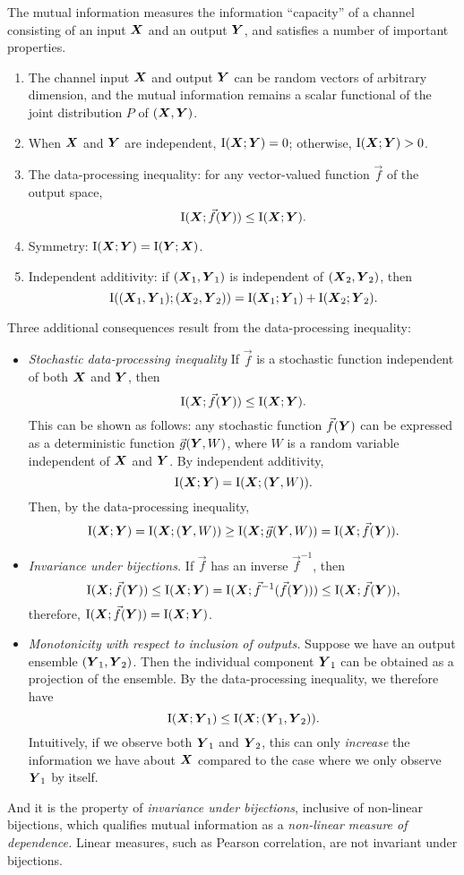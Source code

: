 \documentclass[12pt]{article}
\begin{document}
The mutual information measures the information ``capacity'' of a
channel consisting of an input $\boldsymbol{X}$ and an output $\boldsymbol{Y}$, and
satisfies a number of important properties.
\begin{enumerate}
\item The channel input $\boldsymbol{X}$ and output $\boldsymbol{Y}$ can be random vectors of arbitrary dimension, and the mutual information remains a scalar functional of the joint distribution $P$ of $(\boldsymbol{X}, \boldsymbol{Y})$.
\item When $\boldsymbol{X}$ and $\boldsymbol{Y}$ are independent, $\text{I}(\boldsymbol{X}; \boldsymbol{Y}) = 0$; otherwise, $\text{I}(\boldsymbol{X}; \boldsymbol{Y}) > 0$.
\item The data-processing inequality: for any vector-valued function $\vec{f}$ of the output space,
\[
\text{I}(\boldsymbol{X}; \vec{f}(\boldsymbol{Y})) \leq \text{I}(\boldsymbol{X}; \boldsymbol{Y}).
\]
\item Symmetry: $\text{I}(\boldsymbol{X}; \boldsymbol{Y}) = \text{I}(\boldsymbol{Y}; \boldsymbol{X})$.
\item Independent additivity: if $(\boldsymbol{X}_1,\boldsymbol{Y}_1)$ is independent of $(\boldsymbol{X}_2, \boldsymbol{Y}_2)$, then
\[
\text{I}((\boldsymbol{X}_1,\boldsymbol{Y}_1); (\boldsymbol{X}_2, \boldsymbol{Y}_2)) = \text{I}(\boldsymbol{X}_1; \boldsymbol{Y}_1) + \text{I}(\boldsymbol{X}_2; \boldsymbol{Y}_2).
\]
\end{enumerate}
Three additional consequences result from the data-processing inequality:
\begin{itemize}
\item \emph{Stochastic data-processing inequality}  If $\vec{f}$ is a stochastic function independent of both $\boldsymbol{X}$ and $\boldsymbol{Y}$, then
\[
\text{I}(\boldsymbol{X}; \vec{f}(\boldsymbol{Y})) \leq \text{I}(\boldsymbol{X}; \boldsymbol{Y}).
\]
This can be shown as follows: any stochastic function $\vec{f}(\boldsymbol{Y})$
can be expressed as a deterministic function $\vec{g}(\boldsymbol{Y}, W)$, where
$W$ is a random variable independent of $\boldsymbol{X}$ and $\boldsymbol{Y}$.
By independent additivity,
\[
\text{I}(\boldsymbol{X}; \boldsymbol{Y}) = \text{I}(\boldsymbol{X}; (\boldsymbol{Y}, W)).
\]
Then, by the data-processing inequality,
\[
\text{I}(\boldsymbol{X}; \boldsymbol{Y}) = \text{I}(\boldsymbol{X}; (\boldsymbol{Y}, W)) \geq \text{I}(\boldsymbol{X}; \vec{g}(\boldsymbol{Y}, W)) = \text{I}(\boldsymbol{X}; \vec{f}(\boldsymbol{Y})).
\]
\item \emph{Invariance under bijections.} If $\vec{f}$ has an inverse $\vec{f}^{-1}$, then 
\[
\text{I}(\boldsymbol{X}; \vec{f}(\boldsymbol{Y})) \leq \text{I}(\boldsymbol{X}; \boldsymbol{Y}) = \text{I}(\boldsymbol{X}; \vec{f}^{-1}(\vec{f}(\boldsymbol{Y}))) \leq \text{I}(\boldsymbol{X}; \vec{f}(\boldsymbol{Y})),
\]
therefore, $\text{I}(\boldsymbol{X}; \vec{f}(\boldsymbol{Y})) = \text{I}(\boldsymbol{X}; \boldsymbol{Y})$.
\item \emph{Monotonicity with respect to inclusion of outputs.}  Suppose we have an output ensemble $(\boldsymbol{Y}_1,\boldsymbol{Y}_2)$.  Then the individual component $\boldsymbol{Y}_1$ can be obtained as a projection of the ensemble.  By the data-processing inequality, we therefore have
\[
\text{I}(\boldsymbol{X}; \boldsymbol{Y}_1) \leq \text{I}(\boldsymbol{X}; (\boldsymbol{Y}_1, \boldsymbol{Y}_2)).
\]
Intuitively, if we observe both $\boldsymbol{Y}_1$ and $\boldsymbol{Y}_2$, this can
only \emph{increase} the information we have about $\boldsymbol{X}$ compared to
the case where we only observe $\boldsymbol{Y}_1$ by itself.
\end{itemize}
And it is the property of \emph{invariance under bijections},
inclusive of non-linear bijections, which qualifies mutual information
as a \emph{non-linear measure of dependence.}  Linear measures, such
as Pearson correlation, are not invariant under bijections.  
\end{document}
